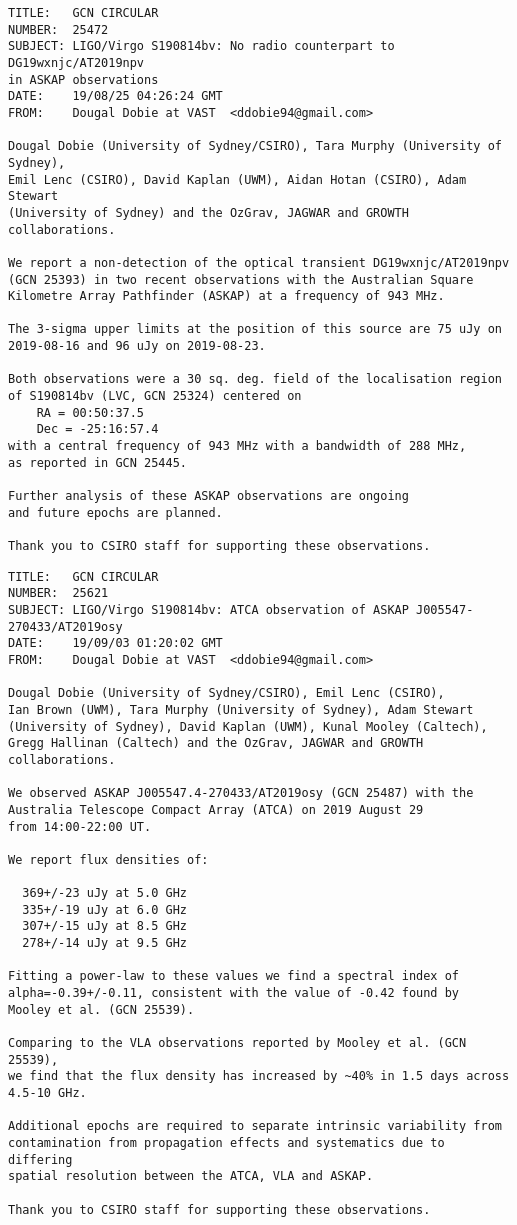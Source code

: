 \begin{verbatim}
TITLE:   GCN CIRCULAR
NUMBER:  25472
SUBJECT: LIGO/Virgo S190814bv: No radio counterpart to DG19wxnjc/AT2019npv
in ASKAP observations
DATE:    19/08/25 04:26:24 GMT
FROM:    Dougal Dobie at VAST  <ddobie94@gmail.com>

Dougal Dobie (University of Sydney/CSIRO), Tara Murphy (University of Sydney),
Emil Lenc (CSIRO), David Kaplan (UWM), Aidan Hotan (CSIRO), Adam Stewart
(University of Sydney) and the OzGrav, JAGWAR and GROWTH collaborations.

We report a non-detection of the optical transient DG19wxnjc/AT2019npv
(GCN 25393) in two recent observations with the Australian Square
Kilometre Array Pathfinder (ASKAP) at a frequency of 943 MHz.

The 3-sigma upper limits at the position of this source are 75 uJy on
2019-08-16 and 96 uJy on 2019-08-23.

Both observations were a 30 sq. deg. field of the localisation region
of S190814bv (LVC, GCN 25324) centered on
    RA = 00:50:37.5
    Dec = -25:16:57.4
with a central frequency of 943 MHz with a bandwidth of 288 MHz,
as reported in GCN 25445.

Further analysis of these ASKAP observations are ongoing
and future epochs are planned.

Thank you to CSIRO staff for supporting these observations.
\end{verbatim}
\pagebreak
{}
\begin{verbatim}
TITLE:   GCN CIRCULAR
NUMBER:  25621
SUBJECT: LIGO/Virgo S190814bv: ATCA observation of ASKAP J005547-270433/AT2019osy
DATE:    19/09/03 01:20:02 GMT
FROM:    Dougal Dobie at VAST  <ddobie94@gmail.com>

Dougal Dobie (University of Sydney/CSIRO), Emil Lenc (CSIRO),
Ian Brown (UWM), Tara Murphy (University of Sydney), Adam Stewart
(University of Sydney), David Kaplan (UWM), Kunal Mooley (Caltech),
Gregg Hallinan (Caltech) and the OzGrav, JAGWAR and GROWTH collaborations.

We observed ASKAP J005547.4-270433/AT2019osy (GCN 25487) with the
Australia Telescope Compact Array (ATCA) on 2019 August 29
from 14:00-22:00 UT.

We report flux densities of:

  369+/-23 uJy at 5.0 GHz
  335+/-19 uJy at 6.0 GHz
  307+/-15 uJy at 8.5 GHz
  278+/-14 uJy at 9.5 GHz

Fitting a power-law to these values we find a spectral index of
alpha=-0.39+/-0.11, consistent with the value of -0.42 found by
Mooley et al. (GCN 25539).

Comparing to the VLA observations reported by Mooley et al. (GCN 25539),
we find that the flux density has increased by ~40% in 1.5 days across
4.5-10 GHz.

Additional epochs are required to separate intrinsic variability from
contamination from propagation effects and systematics due to differing
spatial resolution between the ATCA, VLA and ASKAP.

Thank you to CSIRO staff for supporting these observations.
\end{verbatim}
